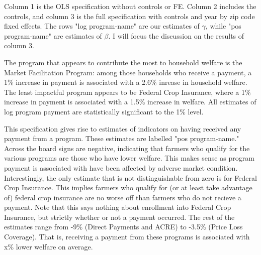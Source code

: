 \documentclass[11pt]{article}
\begin{document}
Column 1 is the OLS specification without controls or FE. Column 2 includes the controls, and column 3 is the full specification with controls and year by zip code fixed effects. The rows "log program-name" are our estimates of \(\gamma\), while "pos program-name" are estimates of \(\beta\). I will focus the discussion on the results of column 3.

The program that appears to contribute the most to household welfare is the Market Facilitation Program: among those households who receive a payment, a 1\% increase in payment is associated with a 2.6\% inrease in household welfare. The least impactful program appears to be Federal Crop Insurance, where a 1\% increase in payment is associated with a 1.5\% increase in welfare. All estimates of log program payment are statistically significant to the 1\% level.

This specification gives rise to estimates of indicators on having received any payment from a program. These estimates are labelled "pos program-name." Across the board signs are negative, indicating that farmers who qualify for the various programs are those who have lower welfare. This makes sense as program payment is associated with have been affected by adverse market condition. Interestingly, the only estimate that is not distinguishable from zero is for Federal Crop Insurance. This implies farmers who qualify for (or at least take advantage of) federal crop insurance are no worse off than farmers who do not recieve a payment. Note that this says nothing about enrollment into Federal Crop Insurance, but strictly whether or not a payment occurred. The rest of the estimates range from -9\% (Direct Payments and ACRE) to -3.5\% (Price Loss Coverage). That is, receiving a payment from these programs is associated with x\% lower welfare on average. 
\end{document}
